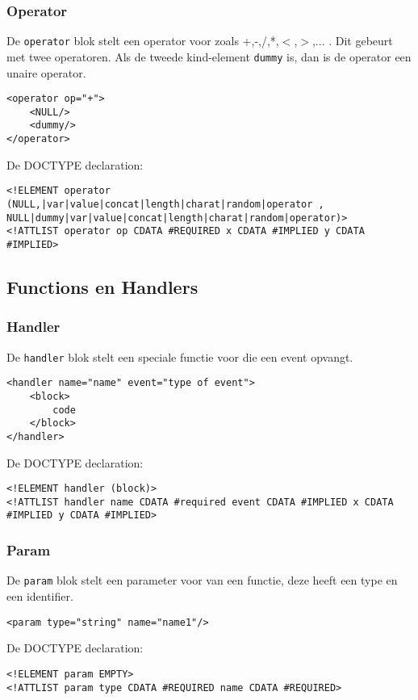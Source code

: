 \documentclass[]{article}
\begin{document}
\subsubsection{Operator}
De \texttt{operator} blok stelt een operator voor zoals +,-,/,*,$<$,$>$,... . Dit gebeurt met twee operatoren. Als de tweede kind-element \texttt{dummy} is, dan is de operator een unaire operator.
\lstset{language=XML}
\begin{lstlisting}
<operator op="+">
    <NULL/> 
    <dummy/>
</operator>
\end{lstlisting}
De DOCTYPE declaration: 
\lstset{language=XML}
\begin{lstlisting}
<!ELEMENT operator (NULL,|var|value|concat|length|charat|random|operator , NULL|dummy|var|value|concat|length|charat|random|operator)>
<!ATTLIST operator op CDATA #REQUIRED x CDATA #IMPLIED y CDATA #IMPLIED>
\end{lstlisting}

\subsection{Functions en Handlers}
\subsubsection{Handler}
De \texttt{handler} blok stelt een speciale functie voor die een event opvangt. 
\lstset{language=XML}
\begin{lstlisting}
<handler name="name" event="type of event">
	<block>
		code
	</block>
</handler>
\end{lstlisting}
De DOCTYPE declaration: 
\lstset{language=XML}
\begin{lstlisting}
<!ELEMENT handler (block)>
<!ATTLIST handler name CDATA #required event CDATA #IMPLIED x CDATA #IMPLIED y CDATA #IMPLIED>
\end{lstlisting}

\subsubsection{Param}
De \texttt{param} blok stelt een parameter voor van een functie, deze heeft een type en een identifier. 
\lstset{language=XML}
\begin{lstlisting}
<param type="string" name="name1"/>

\end{lstlisting}
De DOCTYPE declaration: 
\lstset{language=XML}
\begin{lstlisting}
<!ELEMENT param EMPTY>
<!ATTLIST param type CDATA #REQUIRED name CDATA #REQUIRED>
\end{lstlisting}
\end{document}
